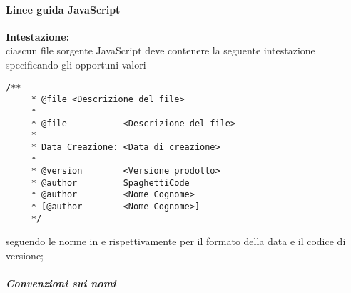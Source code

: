 \paragraph{Linee guida JavaScript}
\label{par:convenzioni_javascript}

\textbf{Intestazione:} \\
ciascun file sorgente JavaScript deve contenere la seguente intestazione specificando gli opportuni valori
\begin{lstlisting}[style=htmlcssjs]
	/**
	 * @file <Descrizione del file>
	 * 
	 * @file           <Descrizione del file>
	 *
	 * Data Creazione: <Data di creazione>
	 *
	 * @version        <Versione prodotto>
	 * @author         SpaghettiCode
	 * @author         <Nome Cognome>
	 * [@author        <Nome Cognome>]
	 */
\end{lstlisting}
seguendo le norme in  e  rispettivamente per il formato della data e il codice di versione;

\subparagraph{Convenzioni sui nomi}

